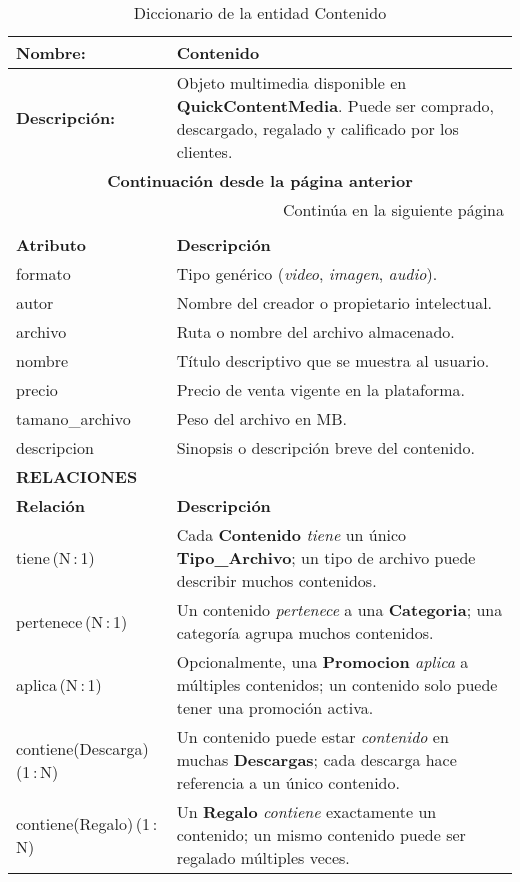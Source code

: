 \renewcommand{\arraystretch}{1.3}
\begin{longtable}{|p{3.5cm}|p{10cm}|}
\caption{Diccionario de la entidad Contenido}
\label{tab:diccionarioContenido} \\ 
\hline
\textbf{Nombre:} & Contenido \\
\hline
\textbf{Descripción:} & 
Objeto multimedia disponible en \textbf{QuickContentMedia}. Puede ser comprado,
descargado, regalado y calificado por los clientes. \\ \hline
\endfirsthead

\multicolumn{2}{c}{\textbf{Continuación desde la página anterior}} \\ 
\endhead

\hline \multicolumn{2}{r}{{Continúa en la siguiente página}} \\ 
\endfoot

\hline
\endlastfoot

\multicolumn{2}{|p{13.5cm}|}{\textbf{ATRIBUTOS}} \\ \hline
\textbf{Atributo} & \textbf{Descripción} \\ \hline
formato         & Tipo genérico (\textit{video}, \textit{imagen}, \textit{audio}). \\ \hline
autor           & Nombre del creador o propietario intelectual. \\ \hline
archivo         & Ruta o nombre del archivo almacenado. \\ \hline
nombre          & Título descriptivo que se muestra al usuario. \\ \hline
precio          & Precio de venta vigente en la plataforma. \\ \hline
tamano\_archivo & Peso del archivo en MB. \\ \hline
descripcion     & Sinopsis o descripción breve del contenido. \\ \hline

\multicolumn{2}{|p{13.5cm}|}{\textbf{RELACIONES}} \\ \hline
\textbf{Relación} & \textbf{Descripción} \\ \hline
tiene\,(N\,:\,1) & Cada \textbf{Contenido} \textit{tiene} un único \textbf{Tipo\_Archivo}; un tipo de archivo puede describir muchos contenidos. \\ \hline
pertenece\,(N\,:\,1) & Un contenido \textit{pertenece} a una \textbf{Categoria}; una categoría agrupa muchos contenidos. \\ \hline
aplica\,(N\,:\,1) & Opcionalmente, una \textbf{Promocion} \textit{aplica} a múltiples contenidos; un contenido solo puede tener una promoción activa. \\ \hline
contiene(Descarga)\,(1\,:\,N) & Un contenido puede estar \textit{contenido} en muchas \textbf{Descargas}; cada descarga hace referencia a un único contenido. \\ \hline
contiene(Regalo)\,(1\,:\,N) & Un \textbf{Regalo} \textit{contiene} exactamente un contenido; un mismo contenido puede ser regalado múltiples veces. \\ \hline
\end{longtable}